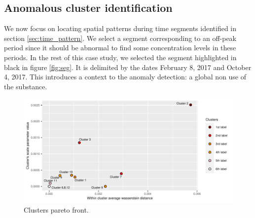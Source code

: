 \subsection{Anomalous cluster identification}\label{subsection:anomalous}
We now focus on locating spatial patterns during time segments identified in section \ref{sec:time_pattern}. We select a segment corresponding to an off-peak period since it should be abnormal to find some concentration levels in these periods. In the rest of this case study, we selected the segment highlighted in black in figure \ref{fig:seg}. It is delimited by the dates February 8, 2017 and October 4, 2017. 
This introduces a context to the anomaly detection: a global non use of the substance. 

\begin{figure}[htbp]
  \centering
  \includegraphics[]{figs/Chap5/Pareto_plot.pdf}
  \caption{Clusters pareto front.}
  \label{fig:pareto:plot}
\end{figure}


